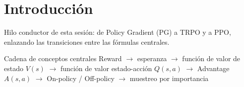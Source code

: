 \section{Introducción}
Hilo conductor de esta sesión: de Policy Gradient (PG) a TRPO y a PPO, enlazando las transiciones entre las fórmulas centrales.

\begin{importantbox}{Cadena de conceptos centrales}
Reward $\to$ esperanza $\to$ función de valor de estado $V(s)$ $\to$ función de valor estado-acción $Q(s,a)$ $\to$ Advantage $A(s,a)$ $\to$ On-policy / Off-policy $\to$ muestreo por importancia
\end{importantbox}

